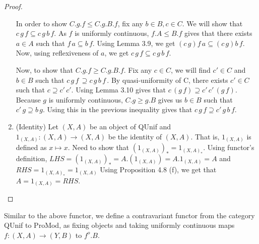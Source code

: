 \documentclass[a4paper]{article}
\theoremstyle{definition}
\begin{document}
\begin{proof}
\begin{enumerate}[label=(\roman*)]
						In order to show $C.g.f \leq C.g.B.f$, fix any $b\in B, c\in C$.
						We will show that $c\,g\,f \subseteq c\,g\,b\,f$. As $f$ is uniformly
						continuous, $f.A \leq B.f$ gives that there exists $a \in A$ such that
						$f\,a \subseteq b\,f$. Using Lemma 3.9, we get $(c\,g)f\,a \subseteq
						(c\,g)b\,f$. Now, using reflexiveness of $a$, we get $c\,g\,f \subseteq
						c\,g\,b\,f$.

						Now, to show that $C.g.f \geq C.g.B.f$. Fix any $c \in C$, we will find $c' \in C$ and
						$b \in B$ such that $c\, g\, f\, \supseteq c\, g\, b\, f\, $. By quasi-uniformity of C,
						there exists $c' \in C$ such that $c \supseteq  c'\, c'$. Using Lemma 3.10
						gives that $c\, (g\, f)\supseteq c'\, c'\, (g\, f) $. Because $g$ is uniformly
						continuous, $C.g \geq g.B$ gives us $b\in B$ such that $c'\, g \supseteq b\, g$.
						Using this in the previous inequality gives that $c\, g\, f \supseteq c'\, g\, b\, f$.

					\item(Identity) Let $(X,A)$ be an object of QUnif and
						$1_{(X,A)}:(X,A)\to(X,A)$ be the identity of $(X,A)$. That is,
						$1_{(X,A)}$ is defined as $x\mapsto x$.
						Need to show that $(1_{(X,A)})_*=1_{(X,A)_*}$. Using
						functor's definition, $LHS=(1_{(X,A)})_*=A.(1_{(X,A)})=A.1_{(X,A)}=A$
						and $RHS=1_{(X,A)_*}=1_{(X,A)}$
						Using Proposition 4.8 (f), we get that $A=1_{(X,A)}=RHS$. \qedhere
				\end{enumerate}
			\end{proof}


			Similar to the above functor, we define a contravariant functor from the category QUnif to ProMod,
			as fixing objects and taking uniformly continuous maps $f:(X,A)\to(Y,B)$ to $f^o.B$.
\end{document}
